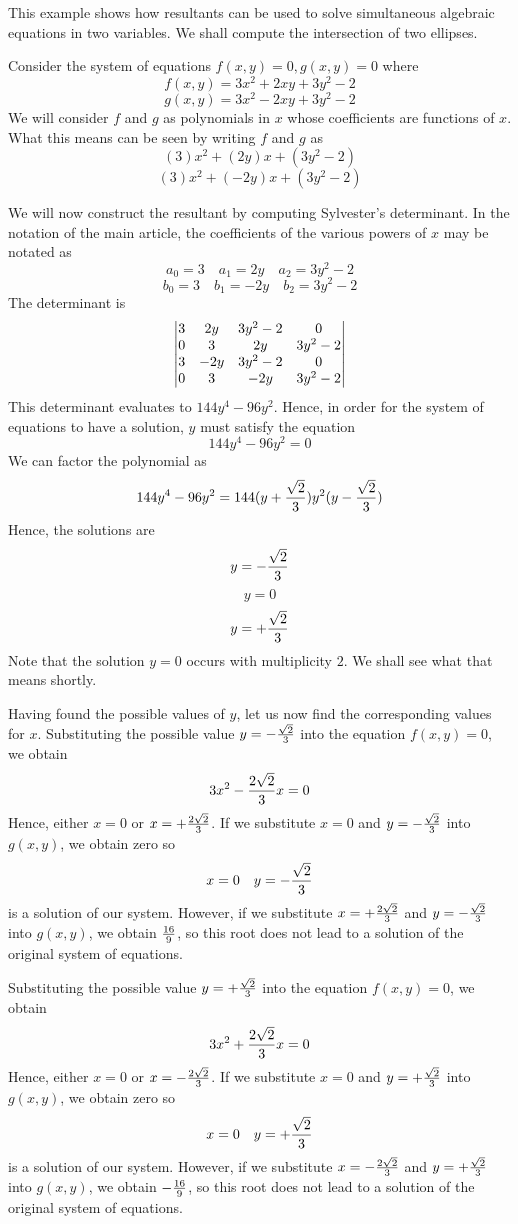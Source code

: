 \documentclass[12pt]{article}
\begin{document}
This example shows how resultants can be used to solve simultaneous algebraic equations in two variables.  We shall compute the intersection of two ellipses.

Consider the system of equations $f(x,y) = 0, g(x,y) = 0$ where
 $$f(x,y) = 3 x^2 + 2 x y + 3 y^2 - 2$$
 $$g(x,y) = 3 x^2 - 2 x y + 3 y^2 - 2$$
We will consider $f$ and $g$ as polynomials in $x$ whose coefficients are functions of $x$.  What this means can be seen by writing $f$ and $g$ as
 $$(3) x^2 + (2 y) x + (3 y^2 - 2)$$
 $$(3) x^2 + (- 2 y) x + (3 y^2 - 2)$$

We will now construct the resultant by computing Sylvester's determinant.  In the notation of the main article, the coefficients of the various powers of $x$ may be notated as
 $$a_0 = 3 \quad a_1 = 2y \quad a_2 = 3 y^2 -2$$
 $$b_0 = 3 \quad b_1 = -2y \quad b_2 = 3 y^2 -2$$
The determinant is
 $$\left| \begin{matrix}
3 & 2y & 3 y^2 -2 & 0  \cr
0 & 3 & 2y & 3 y^2 -2  \cr
3 & -2y & 3 y^2 -2 & 0 \cr
0 & 3 & -2y & 3 y^2 -2 \cr
\end{matrix} \right|$$
This determinant evaluates to $144 y^4 - 96 y^2$.  Hence, in order for the system of equations to have a solution, $y$ must satisfy the equation
 $$144 y^4 - 96 y^2 = 0$$
We can factor the polynomial as
 $$144 y^4 - 96 y^2 = 144 (y + {\sqrt{2} \over 3}) y^2 (y - {\sqrt{2} \over 3})$$
Hence, the solutions are
 $$y = -{\sqrt{2} \over 3}$$
 $$y = 0$$
 $$y = +{\sqrt{2} \over 3}$$
Note that the solution $y=0$ occurs with multiplicity $2$.  We shall see what that means shortly.

Having found the possible values of $y$, let us now find the corresponding values for $x$.  Substituting the possible value $y = -{\sqrt{2} \over 3}$ into the equation $f(x,y) = 0$, we obtain
 $$3 x^2 - {2 \sqrt{2} \over 3} x = 0$$
Hence, either $x = 0$ or $x = +{2 \sqrt{2} \over 3}$.  If we substitute $x = 0$ and $y = -{\sqrt{2} \over 3}$ into $g(x,y)$, we obtain zero so
 $$x = 0 \quad y = -{\sqrt{2} \over 3}$$ is a solution of our system.  However, if we substitute $x = +{2 \sqrt{2} \over 3}$ and $y = -{\sqrt{2} \over 3}$ into $g(x,y)$, we obtain ${16 \over 9}$, so this root does not lead to a solution of the original system of equations.

Substituting the possible value $y = +{\sqrt{2} \over 3}$ into the equation $f(x,y) = 0$, we obtain
 $$3 x^2 + {2 \sqrt{2} \over 3} x = 0$$
Hence, either $x = 0$ or $x = -{2 \sqrt{2} \over 3}$.  If we substitute $x = 0$ and $y = +{\sqrt{2} \over 3}$ into $g(x,y)$, we obtain zero so
 $$x = 0 \quad y = +{\sqrt{2} \over 3}$$ is a solution of our system.  However, if we substitute $x = -{2 \sqrt{2} \over 3}$ and $y = +{\sqrt{2} \over 3}$ into $g(x,y)$, we obtain $-{16 \over 9}$, so this root does not lead to a solution of the original system of equations.
\end{document}
